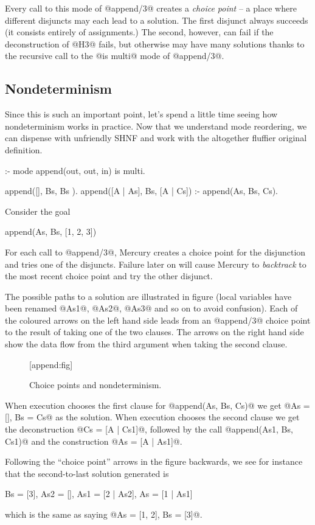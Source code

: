 Every call to this mode of @append/3@ creates a \emph{choice
point} -- a place where different disjuncts may each lead to a solution.
The first disjunct always succeeds (it consists entirely of
assignments.)  The second, however, can fail if the deconstruction of
@H3@ fails, but otherwise may have many solutions thanks to the
recursive call to the @is multi@ mode of @append/3@.

\subsection{Nondeterminism}

Since this is such an important point, let's spend a little time seeing
how nondeterminism works in practice.  Now that we understand mode
reordering, we can dispense with unfriendly SHNF and work with the
altogether fluffier original definition.
\begin{myverbatim}
:- mode append(out, out, in) is multi.

append([],       Bs, Bs      ).
append([A | As], Bs, [A | Cs]) :- append(As, Bs, Cs).
\end{myverbatim}
Consider the goal
\begin{myverbatim}
    append(As, Bs, [1, 2, 3])
\end{myverbatim}
For each call to @append/3@, Mercury creates a choice point for the
disjunction and tries one of the disjuncts.  Failure later on will cause
Mercury to \emph{backtrack} to the most recent choice point and try the
other disjunct.

The possible paths to a solution are illustrated in figure
(local variables have been renamed @As1@, @As2@, @As3@ and so on to
avoid confusion).
Each of the coloured arrows on the left hand side leads from an
@append/3@ choice point to the result of taking one of the two
clauses.
The arrows on the right hand side show the data flow
from the third argument when taking the second clause.
\begin{figure}[ht]
\caption{Choice points and nondeterminism.}[append:fig]
\end{figure}

When execution chooses the first clause for @append(As, Bs, Cs)@
we get @As = [], Bs = Cs@ as the solution.  When
execution chooses the second clause we get the deconstruction
@Cs = [A | Cs1]@, followed by the call @append(As1, Bs, Cs1)@ and the
construction @As = [A | As1]@.

Following the ``choice point'' arrows in the figure backwards, we see for
instance that the second-to-last solution generated is
\begin{myverbatim}
    Bs  = [3],
    As2 = [],
    As1 = [2 | As2],
    As  = [1 | As1]
\end{myverbatim}
which is the same as saying @As = [1, 2], Bs = [3]@.


